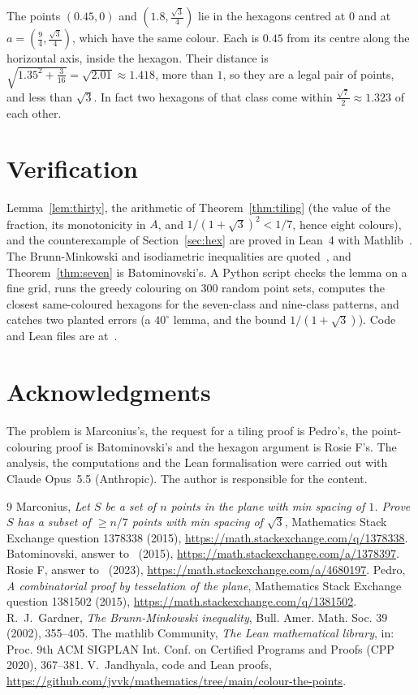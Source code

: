 \documentclass[11pt]{amsart}
\theoremstyle{remark}
\begin{document}
The points $(0.45,0)$ and $(1.8,\frac{\sqrt3}4)$ lie in the hexagons centred at $0$ and at $a=(\frac94,\frac{\sqrt3}4)$, which have the same colour. Each is $0.45$ from its centre along the horizontal axis, inside the hexagon. Their distance is $\sqrt{1.35^2+\frac3{16}}=\sqrt{2.01}\approx1.418$, more than $1$, so they are a legal pair of points, and less than $\sqrt3$. In fact two hexagons of that class come within $\frac{\sqrt7}2\approx1.323$ of each other.

\section{Verification}

Lemma~\ref{lem:thirty}, the arithmetic of Theorem~\ref{thm:tiling} (the value of the fraction, its monotonicity in $A$, and $1/(1+\sqrt3)^2<1/7$, hence eight colours), and the counterexample of Section~\ref{sec:hex} are proved in Lean~4 with Mathlib~\cite{mathlib}. The Brunn-Minkowski and isodiametric inequalities are quoted~\cite{Gardner}, and Theorem~\ref{thm:seven} is Batominovski's. A Python script checks the lemma on a fine grid, runs the greedy colouring on $300$ random point sets, computes the closest same-coloured hexagons for the seven-class and nine-class patterns, and catches two planted errors (a $40^\circ$ lemma, and the bound $1/(1+\sqrt3)$). Code and Lean files are at~\cite{repo}.

\section*{Acknowledgments}

The problem is Marconius's, the request for a tiling proof is Pedro's, the point-colouring proof is Batominovski's and the hexagon argument is Rosie F's. The analysis, the computations and the Lean formalisation were carried out with Claude Opus~5.5 (Anthropic). The author is responsible for the content.

\begin{thebibliography}{9}
 Marconius, \emph{Let $S$ be a set of $n$ points in the plane with min spacing of $1$. Prove $S$ has a subset of $\ge n/7$ points with min spacing of $\sqrt{3}$}, Mathematics Stack Exchange question 1378338 (2015), \url{https://math.stackexchange.com/q/1378338}.
 Batominovski, answer to~\cite{MSEa} (2015), \url{https://math.stackexchange.com/a/1378397}.
 Rosie F, answer to~\cite{MSEa} (2023), \url{https://math.stackexchange.com/a/4680197}.
 Pedro, \emph{A combinatorial proof by tesselation of the plane}, Mathematics Stack Exchange question 1381502 (2015), \url{https://math.stackexchange.com/q/1381502}.
 R.~J.~Gardner, \emph{The Brunn-Minkowski inequality}, Bull. Amer. Math. Soc. 39 (2002), 355--405.
 The mathlib Community, \emph{The Lean mathematical library}, in: Proc. 9th ACM SIGPLAN Int. Conf. on Certified Programs and Proofs (CPP 2020), 367--381.
 V.~Jandhyala, code and Lean proofs, \url{https://github.com/jvvk/mathematics/tree/main/colour-the-points}.
\end{thebibliography}
\end{document}

